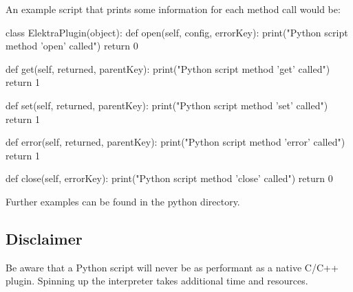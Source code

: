 An example script that prints some information for each method call would be\+:


\begin{DoxyCode}
\textcolor{keyword}{class }ElektraPlugin(object):
    \textcolor{keyword}{def }open(self, config, errorKey):
        print(\textcolor{stringliteral}{"Python script method 'open' called"})
        \textcolor{keywordflow}{return} 0

    \textcolor{keyword}{def }get(self, returned, parentKey):
        print(\textcolor{stringliteral}{"Python script method 'get' called"})
        \textcolor{keywordflow}{return} 1

    \textcolor{keyword}{def }set(self, returned, parentKey):
        print(\textcolor{stringliteral}{"Python script method 'set' called"})
        \textcolor{keywordflow}{return} 1

    \textcolor{keyword}{def }error(self, returned, parentKey):
        print(\textcolor{stringliteral}{"Python script method 'error' called"})
        \textcolor{keywordflow}{return} 1

    \textcolor{keyword}{def }close(self, errorKey):
        print(\textcolor{stringliteral}{"Python script method 'close' called"})
        \textcolor{keywordflow}{return} 0
\end{DoxyCode}


Further examples can be found in the python directory.

\subsection*{Disclaimer}

Be aware that a Python script will never be as performant as a native C/\+C++ plugin. Spinning up the interpreter takes additional time and resources. 